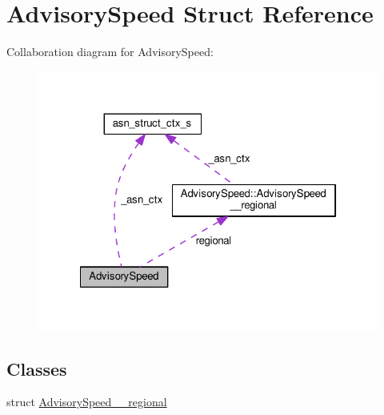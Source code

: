 \hypertarget{structAdvisorySpeed}{}\section{Advisory\+Speed Struct Reference}
\label{structAdvisorySpeed}


Collaboration diagram for Advisory\+Speed\+:\nopagebreak
\begin{figure}[H]
\begin{center}
\leavevmode
\includegraphics[width=322pt]{structAdvisorySpeed__coll__graph}
\end{center}
\end{figure}
\subsection*{Classes}
\begin{DoxyCompactItemize}
\item 
struct \hyperlink{structAdvisorySpeed_1_1AdvisorySpeed____regional}{Advisory\+Speed\+\_\+\+\_\+regional}
\end{DoxyCompactItemize}
